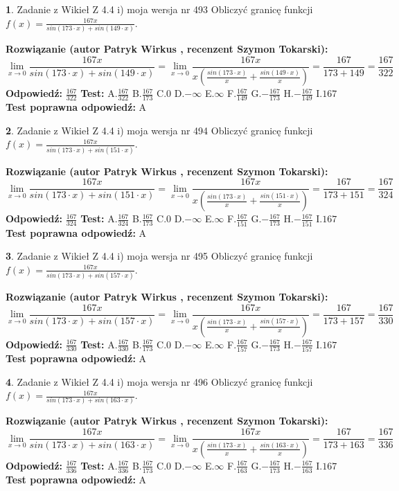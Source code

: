 \documentclass[12pt, a4paper]{article}
\theoremstyle{definition} %
\newtheorem{zad}{}
\newcommand{\zadStart}[1]{\begin{zad}#1\newline}
\newcommand{\zadStop}{\end{zad}}
\newcommand{\rozwStart}[2]{\noindent \textbf{Rozwiązanie (autor #1 , recenzent #2): }\newline}
\newcommand{\rozwStop}{\newline}
\newcommand{\odpStart}{\noindent \textbf{Odpowiedź:}\newline}
\newcommand{\odpStop}{\newline}
\newcommand{\testStart}{\noindent \textbf{Test:}\newline}
\newcommand{\testStop}{\newline}
\newcommand{\kluczStart}{\noindent \textbf{Test poprawna odpowiedź:}\newline}
\newcommand{\kluczStop}{\newline}
\begin{document}
\zadStart{Zadanie z Wikieł Z 4.4 i) moja wersja nr 493}
Obliczyć granicę funkcji $f(x)=\frac{167x}{sin(173\cdot x) +sin(149\cdot x)}$.
\zadStop
\rozwStart{Patryk Wirkus}{Szymon Tokarski}
$$\lim\limits_{x\to 0}\frac{167x}{sin(173\cdot x) +sin(149\cdot x)}=\lim\limits_{x\to 0}\frac{167x}{x(\frac{sin(173\cdot x)}{x}+\frac{sin(149\cdot x)}{x})}=\frac{167}{173+149} = \frac{167}{322}$$
\rozwStop
\odpStart
$\frac{167}{322}$
\odpStop
\testStart
A.$\frac{167}{322}$
B.$\frac{167}{173}$
C.$0$
D.$-\infty$
E.$\infty$
F.$\frac{167}{149}$
G.$-\frac{167}{173}$
H.$-\frac{167}{149}$
I.$167$
\testStop
\kluczStart
A
\kluczStop



\zadStart{Zadanie z Wikieł Z 4.4 i) moja wersja nr 494}
Obliczyć granicę funkcji $f(x)=\frac{167x}{sin(173\cdot x) +sin(151\cdot x)}$.
\zadStop
\rozwStart{Patryk Wirkus}{Szymon Tokarski}
$$\lim\limits_{x\to 0}\frac{167x}{sin(173\cdot x) +sin(151\cdot x)}=\lim\limits_{x\to 0}\frac{167x}{x(\frac{sin(173\cdot x)}{x}+\frac{sin(151\cdot x)}{x})}=\frac{167}{173+151} = \frac{167}{324}$$
\rozwStop
\odpStart
$\frac{167}{324}$
\odpStop
\testStart
A.$\frac{167}{324}$
B.$\frac{167}{173}$
C.$0$
D.$-\infty$
E.$\infty$
F.$\frac{167}{151}$
G.$-\frac{167}{173}$
H.$-\frac{167}{151}$
I.$167$
\testStop
\kluczStart
A
\kluczStop



\zadStart{Zadanie z Wikieł Z 4.4 i) moja wersja nr 495}
Obliczyć granicę funkcji $f(x)=\frac{167x}{sin(173\cdot x) +sin(157\cdot x)}$.
\zadStop
\rozwStart{Patryk Wirkus}{Szymon Tokarski}
$$\lim\limits_{x\to 0}\frac{167x}{sin(173\cdot x) +sin(157\cdot x)}=\lim\limits_{x\to 0}\frac{167x}{x(\frac{sin(173\cdot x)}{x}+\frac{sin(157\cdot x)}{x})}=\frac{167}{173+157} = \frac{167}{330}$$
\rozwStop
\odpStart
$\frac{167}{330}$
\odpStop
\testStart
A.$\frac{167}{330}$
B.$\frac{167}{173}$
C.$0$
D.$-\infty$
E.$\infty$
F.$\frac{167}{157}$
G.$-\frac{167}{173}$
H.$-\frac{167}{157}$
I.$167$
\testStop
\kluczStart
A
\kluczStop



\zadStart{Zadanie z Wikieł Z 4.4 i) moja wersja nr 496}
Obliczyć granicę funkcji $f(x)=\frac{167x}{sin(173\cdot x) +sin(163\cdot x)}$.
\zadStop
\rozwStart{Patryk Wirkus}{Szymon Tokarski}
$$\lim\limits_{x\to 0}\frac{167x}{sin(173\cdot x) +sin(163\cdot x)}=\lim\limits_{x\to 0}\frac{167x}{x(\frac{sin(173\cdot x)}{x}+\frac{sin(163\cdot x)}{x})}=\frac{167}{173+163} = \frac{167}{336}$$
\rozwStop
\odpStart
$\frac{167}{336}$
\odpStop
\testStart
A.$\frac{167}{336}$
B.$\frac{167}{173}$
C.$0$
D.$-\infty$
E.$\infty$
F.$\frac{167}{163}$
G.$-\frac{167}{173}$
H.$-\frac{167}{163}$
I.$167$
\testStop
\kluczStart
A
\kluczStop
\end{document}
